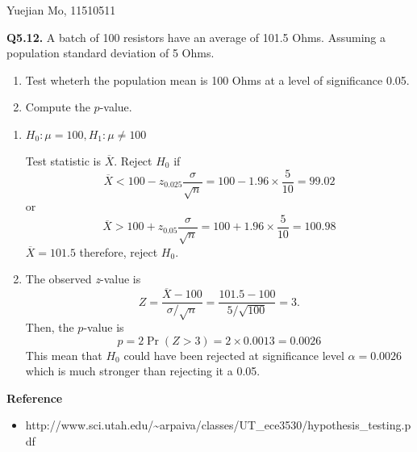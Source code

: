 \documentclass{article}
\newcommand{\tmtextbf}[1]{{\bfseries{#1}}}
\newcommand{\tmtextit}[1]{{\itshape{#1}}}
{\theorembodyfont{\rmfamily}\newtheorem{answer}{Answer}}
\begin{document}
Yuejian Mo, 11510511

\tmtextbf{Q5.12.} A batch of 100 resistors have an average of 101.5 Ohms.
Assuming a population standard deviation of 5 Ohms.
\begin{enumerate}
  \item Test wheterh the population mean is 100 Ohms at a level of
  significance 0.05.
  
  \item Compute the $p$-value.
\end{enumerate}
\begin{answer}
  
  \begin{enumerate}
    \item $H_0 : \mu = 100, H_1 : \mu \neq 100$
    
    Test statistic is $\overline{X}$. Reject $H_0$ if
    \[ \overline{X} < 100 - z_{0.025} \frac{\sigma}{\sqrt{n}} = 100 - 1.96
       \times \frac{5}{10} = 99.02 \]
    or
    \[ \overline{X} > 100 + z_{0.05} \frac{\sigma}{\sqrt{n}} = 100 + 1.96
       \times \frac{5}{10} = 100.98 \]
    $\overline{X} = 101.5$ therefore, reject $H_0$.
    
    \item The observed \tmtextit{z}-value is
    \[ Z = \frac{\overline{X} - 100}{\sigma / \sqrt{n}} = \frac{101.5 - 100}{5
       / \sqrt{100}} = 3. \]
    Then, the $p$-value is
    \[ p = 2 \Pr (Z > 3) = 2 \times 0.0013 = 0.0026 \]
    This mean that $H_0$ could have been rejected at significance level
    $\alpha = 0.0026$ which is much stronger than rejecting it a 0.05.
  \end{enumerate}
\end{answer}

\tmtextbf{Reference}
\begin{itemize}
  \item
  http://www.sci.utah.edu/\~{}arpaiva/classes/UT\_ece3530/hypothesis\_testing.pdf
\end{itemize}
\end{document}
